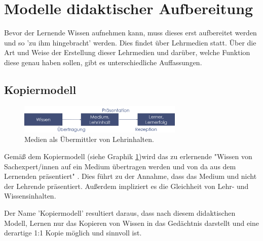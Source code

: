 \section{Modelle didaktischer Aufbereitung}
\label{sec:Lernmodelle}
Bevor der Lernende Wissen aufnehmen kann, muss dieses erst aufbereitet werden und so 'zu ihm hingebracht' werden. Dies findet über Lehrmedien statt. Über die Art und Weise der Erstellung dieser Lehrmedien und darüber, welche Funktion diese genau haben sollen, gibt es unterschiedliche Auffassungen. %

\subsection{Kopiermodell}
\label{sub:Kopiermodell}
\begin{figure}[h]
	\centering
	\includegraphics[width=0.7\textwidth]{Abbildungen/Kopiermodell.PNG}
	\caption{Medien als Übermittler von Lehrinhalten. \cite[S. 146]{Kerres.2001}}
	\label{fig:Kerres2001_Kopiermodell}
\end{figure}
Gemäß dem Kopiermodell (siehe Graphik \ref{fig:Kerres2001_Kopiermodell})wird das zu erlernende "Wissen von Sachexpert/innen auf ein Medium übertragen werden und von da aus dem Lernenden präsentiert" \cite[S. 146]{Kerres.2001}. Dies führt zu der Annahme, dass das Medium und nicht der Lehrende präsentiert. Außerdem impliziert es die Gleichheit von Lehr- und Wissensinhalten. %

Der Name 'Kopiermodell' resultiert daraus, dass nach diesem didaktischen Modell, Lernen nur das Kopieren von Wissen in das Gedächtnis darstellt und eine derartige 1:1 Kopie möglich und sinnvoll ist. \cite[S. 145 f.]{Kerres.2001}

